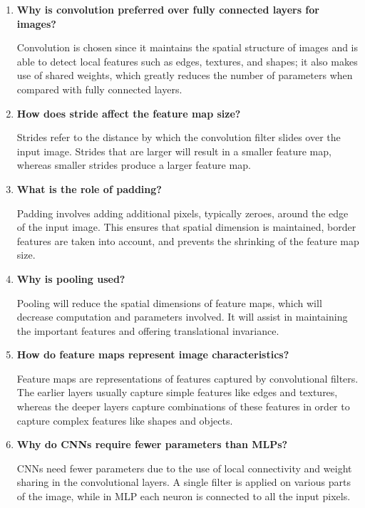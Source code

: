 \documentclass[11pt]{article}
\begin{document}
\begin{enumerate}

\item \textbf{Why is convolution preferred over fully connected layers for images?}

Convolution is chosen since it maintains the spatial structure of images and is able to detect local features such as edges, textures, and shapes; it also makes use of shared weights, which greatly reduces the number of parameters when compared with fully connected layers.

\item \textbf{How does stride affect the feature map size?}

Strides refer to the distance by which the convolution filter slides over the input image. Strides that are larger will result in a smaller feature map, whereas smaller strides produce a larger feature map.

\item \textbf{What is the role of padding?}

Padding involves adding additional pixels, typically zeroes, around the edge of the input image. This ensures that spatial dimension is maintained, border features are taken into account, and prevents the shrinking of the feature map size.

\item \textbf{Why is pooling used?}

Pooling will reduce the spatial dimensions of feature maps, which will decrease computation and parameters involved. It will assist in maintaining the important features and offering translational invariance.

\item \textbf{How do feature maps represent image characteristics?}

Feature maps are representations of features captured by convolutional filters. The earlier layers usually capture simple features like edges and textures, whereas the deeper layers capture combinations of these features in order to capture complex features like shapes and objects.

\item \textbf{Why do CNNs require fewer parameters than MLPs?}

CNNs need fewer parameters due to the use of local connectivity and weight sharing in the convolutional layers. A single filter is applied on various parts of the image, while in MLP each neuron is connected to all the input pixels.

\end{enumerate}
\end{document}
